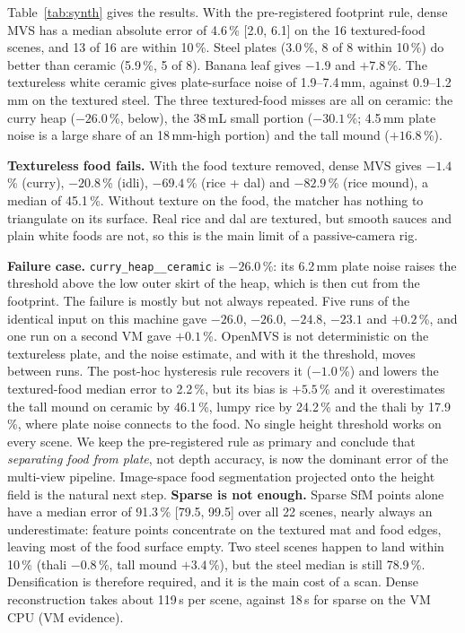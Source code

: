 Table~\ref{tab:synth} gives the results. With the pre-registered footprint
rule, dense MVS has a median absolute error of 4.6\,\% [2.0, 6.1] on the 16
textured-food scenes, and 13 of 16 are within 10\,\%. Steel plates (3.0\,\%,
8 of 8 within 10\,\%) do better than ceramic (5.9\,\%, 5 of 8). Banana leaf
gives $-1.9$ and $+7.8$\,\%. The textureless white ceramic gives plate-surface
noise of 1.9--7.4\,mm, against 0.9--1.2\,mm on the textured steel. The three
textured-food misses are all on ceramic: the curry heap ($-26.0$\,\%, below),
the 38\,mL small portion ($-30.1$\,\%; 4.5\,mm plate noise is a large share of
an 18\,mm-high portion) and the tall mound ($+16.8$\,\%).

\textbf{Textureless food fails.} With the food texture removed, dense MVS gives
$-1.4$\,\% (curry), $-20.8$\,\% (idli), $-69.4$\,\% (rice + dal) and
$-82.9$\,\% (rice mound), a median of 45.1\,\%. Without texture on the food,
the matcher has nothing to triangulate on its surface. Real rice and dal are
textured, but smooth sauces and plain white foods are not, so this is the
main limit of a passive-camera rig.

\textbf{Failure case.} \texttt{curry\_heap\_\_ceramic} is $-26.0$\,\%: its
6.2\,mm plate noise raises the threshold above the low outer skirt of the
heap, which is then cut from the footprint. The failure is mostly but not
always repeated. Five runs of the identical input on this machine gave
$-26.0$, $-26.0$, $-24.8$, $-23.1$ and $+0.2$\,\%, and one run on a second VM
gave $+0.1$\,\%. OpenMVS is not deterministic on the textureless plate, and the
noise estimate, and with it the threshold, moves between runs. The post-hoc hysteresis rule
recovers it ($-1.0$\,\%) and lowers the textured-food median error to
2.2\,\%, but its bias is $+5.5$\,\% and it overestimates the tall mound on
ceramic by 46.1\,\%, lumpy rice by 24.2\,\% and the thali by 17.9\,\%, where
plate noise connects to the food. No single height
threshold works on every scene. We keep the pre-registered rule as primary
and conclude that \emph{separating food from plate}, not depth accuracy, is
now the dominant error of the multi-view pipeline. Image-space food
segmentation projected onto the height field is the natural next step.
\textbf{Sparse is not enough.} Sparse SfM points alone have a median error of
91.3\,\% [79.5, 99.5] over all 22 scenes, nearly always an underestimate:
feature points concentrate on the textured mat and food edges, leaving most of
the food surface empty. Two steel scenes happen to land within 10\,\%
(thali $-0.8$\,\%, tall mound $+3.4$\,\%), but the steel median is still
78.9\,\%.
Densification is therefore required, and it is the main cost of a scan.
Dense reconstruction takes about 119\,s per scene, against 18\,s for sparse on the VM CPU (VM evidence).
